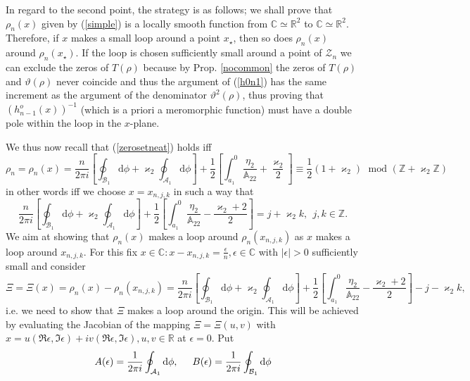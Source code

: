 \documentclass[10pt,oneside,reqno]{amsart}
\numberwithin{equation}{section}
\renewcommand{\d}{{\mathrm d}}
\def\mod{\, \mathrm{mod}\,\,}
\def\C{{\mathbb C}}
\def\R{{\mathbb R}}
\def\eqref#1{(\ref{#1})}
\begin{document}
In regard to the second point, the strategy is as follows; we shall prove that $\rho_n(x)$ given by \eqref{simple} is a  locally smooth function from $\C \simeq \R^2$ to $\C \simeq \R^2$. Therefore, if $x$ makes a small loop around a point $x_\star$, then so does $\rho_n (x)$ around $\rho_n(x_\star)$. If the loop is chosen sufficiently small around a point of $\mathcal Z_n$ we can exclude the zeros of $T(\rho)$ because by Prop. \ref{nocommon} the zeros of $T(\rho)$ and $\vartheta(\rho)$ never coincide and thus the argument of \eqref{h0n1} has the same increment as the argument of the denominator $\vartheta^2(\rho)$, thus proving that $(h^o_{n-1}(x))^{-1}$ (which is a priori a meromorphic function) must have a double pole within the loop in the $x$-plane.\smallskip

We thus now recall that \eqref{zerosetneat} holds iff
\begin{equation*}
  \rho_n=\rho_n(x)=\frac{n}{2\pi i}\left[\oint_{\mathcal{B}_1}\d\phi+\varkappa_2\oint_{\mathcal{A}_1}\d\phi\right]
  +\frac{1}{2}\left[\int_{a_1}^0\frac{\eta_2}{\mathbb{A}_{22}}+\frac{\varkappa_2}{2}\right]\equiv \frac{1}{2}(1+\varkappa_2)\ \ \mod(\mathbb{Z}+\varkappa_2\mathbb{Z})
\end{equation*}
in other words iff we choose $x=x_{n,j,k}$ in such a way that
\begin{equation*}
  \frac{n}{2\pi i}\left[\oint_{\mathcal{B}_1}\d\phi+\varkappa_2\oint_{\mathcal{A}_1}\d\phi\right]+\frac{1}{2}\left[\int_{a_1}^0\frac{\eta_2}{\mathbb{A}_{22}}-\frac{\varkappa_2+2}{2}\right]=
j+\varkappa_2k,\ \ j,k\in\mathbb{Z}.
\end{equation*}
We aim at showing that $\rho_n(x)$ makes a loop around $\rho_n(x_{n,j,k})$ as $x$ makes a loop around  $x_{n,j,k}$. For this fix
$x\in\mathbb{C}:x-x_{n,j,k}=\frac{\epsilon}{n},\epsilon\in\mathbb{C}$ with $|\epsilon|>0$ sufficiently small and consider
\begin{equation*}
 \Xi=\Xi(x)=\rho_n(x)-\rho_n(x_{n,j,k}) = \frac{n}{2\pi i}\left[\oint_{\mathcal{B}_1}\d\phi+\varkappa_2\oint_{\mathcal{A}_1}\d\phi\right]+\frac{1}{2}\left[\int_{a_1}^0\frac{\eta_2}{\mathbb{A}_{22}}-\frac{\varkappa_2+2}{2}\right]
-j-\varkappa_2k,
\end{equation*}
i.e. we need to show that $\Xi$ makes a loop around the origin. This will be achieved by evaluating the Jacobian of the mapping $\Xi=\Xi(u,v)$ with $x=u(\Re\epsilon,\Im\epsilon)+iv(\Re\epsilon,\Im\epsilon),u,v\in\mathbb{R}$ at $\epsilon=0$. Put
\begin{equation*}
  A(\epsilon)=\frac{1}{2\pi i}\oint_{\mathcal{A}_1}\d\phi,\hspace{0.5cm}B(\epsilon)=\frac{1}{2\pi i}\oint_{\mathcal{B}_1}\d\phi
\end{equation*}
\end{document}
